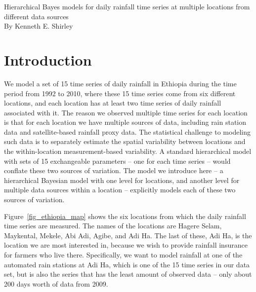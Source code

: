 \documentclass[12pt]{article}
\begin{document}
\begin{center}
{\Large Hierarchical Bayes models for daily rainfall time series at multiple locations from different data sources}
\vspace{1in}\\
By Kenneth E. Shirley
\end{center}



\newpage

\section{Introduction}
We model a set of 15 time series of daily rainfall in Ethiopia during the time period from 1992 to 2010, where these 15 time series come from six different locations, and each location has at least two time series of daily rainfall associated with it. The reason we observed multiple time series for each location is that for each location we have multiple sources of data, including rain station data and satellite-based rainfall proxy data. The statistical challenge to modeling such data is to separately estimate the spatial variability between locations and the within-location measurement-based variability. A standard hierarchical model with sets of 15 exchangeable parameters -- one for each time series -- would conflate these two sources of variation. The model we introduce here -- a hierarchical Bayesian model with one level for locations, and another level for multiple data sources within a location -- explicitly models each of these two sources of variation.

Figure~\ref{fig_ethiopia_map} shows the six locations from which the daily rainfall time series are measured. The names of the locations are Hagere Selam, Maykental, Mekele, Abi Adi, Agibe, and Adi Ha. The last of these, Adi Ha, is the location we are most interested in, because we wish to provide rainfall insurance for farmers who live there. Specifically, we want to model rainfall at one of the automated rain stations at Adi Ha, which is one of the 15 time series in our data set, but is also the series that has the least amount of observed data -- only about 200 days worth of data from 2009.
\end{document}
